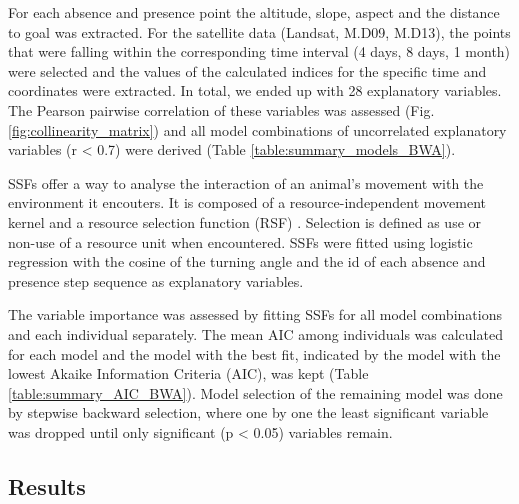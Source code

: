 \documentclass[12pt,a4paper, twoside, english]{article}
\begin{document}
For each absence and presence point the altitude, slope, aspect and the distance to goal was extracted. For the satellite data (Landsat, M.D09, M.D13), the points that were falling within the corresponding time interval (4 days, 8 days, 1 month) were selected and the values of the calculated indices for the specific time and coordinates were extracted. In total, we ended up with 28 explanatory variables. The Pearson pairwise correlation of these variables was assessed (Fig. \ref{fig:collinearity_matrix}) and all model combinations of uncorrelated explanatory variables (r < 0.7) were derived (Table \ref{table:summary_models_BWA}). 

SSFs offer a way to analyse the interaction of an animal's movement with the environment it encouters. It is composed of a resource-independent movement kernel and a resource selection function (RSF) \citep{Forester2009}. Selection is defined as use or non-use of a resource unit when encountered. SSFs were fitted using logistic regression with the cosine of the turning angle and the id of each absence and presence step sequence as explanatory variables. 

The variable importance was assessed by fitting SSFs for all model combinations and each individual separately. The mean AIC among individuals was calculated for each model and the model with the best fit, indicated by the model with the lowest Akaike Information Criteria (AIC), was kept (Table \ref{table:summary_AIC_BWA}). Model selection of the remaining model was done by stepwise backward selection, where one by one the least significant variable was dropped until only significant (p < 0.05) variables remain.




\subsection{Results}
\end{document}

